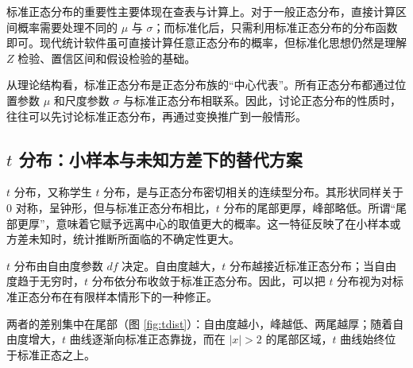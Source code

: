 \documentclass[UTF8]{ctexbook}
\begin{document}
标准正态分布的重要性主要体现在查表与计算上。对于一般正态分布，直接计算区间概率需要处理不同的 $\mu$ 与 $\sigma$；而标准化后，只需利用标准正态分布的分布函数即可。现代统计软件虽可直接计算任意正态分布的概率，但标准化思想仍然是理解 $Z$ 检验、置信区间和假设检验的基础。

从理论结构看，标准正态分布是正态分布族的“中心代表”。所有正态分布都通过位置参数 $\mu$ 和尺度参数 $\sigma$ 与标准正态分布相联系。因此，讨论正态分布的性质时，往往可以先讨论标准正态分布，再通过变换推广到一般情形。

\subsection{$t$ 分布：小样本与未知方差下的替代方案}

$t$ 分布，又称学生 $t$ 分布，是与正态分布密切相关的连续型分布。其形状同样关于 $0$ 对称，呈钟形，但与标准正态分布相比，$t$ 分布的尾部更厚，峰部略低。所谓“尾部更厚”，意味着它赋予远离中心的取值更大的概率。这一特征反映了在小样本或方差未知时，统计推断所面临的不确定性更大。

$t$ 分布由自由度参数 $df$ 决定。自由度越大，$t$ 分布越接近标准正态分布；当自由度趋于无穷时，$t$ 分布依分布收敛于标准正态分布。因此，可以把 $t$ 分布视为对标准正态分布在有限样本情形下的一种修正。

两者的差别集中在尾部（图 \ref{fig:tdist}）：自由度越小，峰越低、两尾越厚；随着自由度增大，$t$ 曲线逐渐向标准正态靠拢，而在 $|x|>2$ 的尾部区域，$t$ 曲线始终位于标准正态之上。
\end{document}

